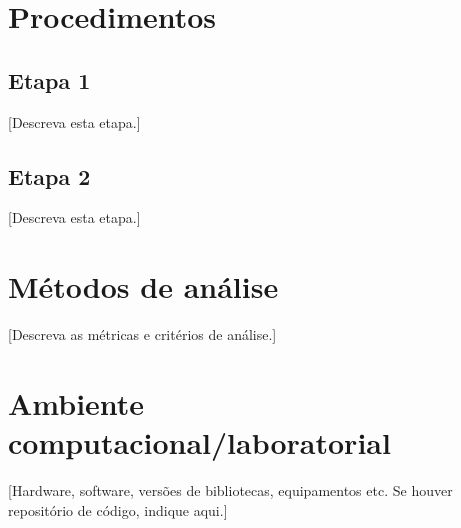 \section{Procedimentos}
\label{sec:procedimentos}

\subsection{Etapa 1}
\label{sec:etapa-1}

[Descreva esta etapa.]

\subsection{Etapa 2}
\label{sec:etapa-2}

[Descreva esta etapa.]

\section{Métodos de análise}
\label{sec:analise}

[Descreva as métricas e critérios de análise.]

\section{Ambiente computacional/laboratorial}
\label{sec:ambiente}

[Hardware, software, versões de bibliotecas, equipamentos etc.
Se houver repositório de código, indique aqui.]
